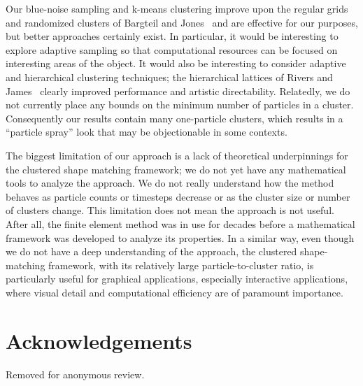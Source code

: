 \documentclass[review]{acmsiggraph}
\begin{document}
Our blue-noise sampling and k-means clustering improve upon the regular grids and
randomized clusters of Bargteil and Jones~ and are effective for our purposes,
but better approaches certainly exist.  In particular, it would be interesting to explore adaptive sampling
so that computational resources can be focused on interesting areas of the object.  It would also be interesting
to consider adaptive and hierarchical clustering techniques; the hierarchical lattices of Rivers and James~\cite{Rivers:2007:FFL}
clearly improved performance and artistic directability.  Relatedly, we do not currently place any bounds on the minimum
number of particles in a cluster.  Consequently our results contain many one-particle clusters, which results in a 
``particle spray'' look that may be objectionable in some contexts.

The biggest limitation of our approach is a lack of theoretical underpinnings for the clustered shape matching
framework; we do not yet have any mathematical tools to analyze the approach.  We do not really understand
how the method behaves as particle counts or timesteps decrease or as the cluster size or number of clusters change.
This limitation does not mean the approach is not useful.  After all, the finite element method was in use
for decades before a mathematical framework was developed to analyze its properties.  In a similar way,
even though we do not have a deep understanding of the approach, the clustered shape-matching framework, with its
relatively large particle-to-cluster ratio,
is particularly useful for graphical applications, especially interactive applications, where visual detail
and computational efficiency are of paramount importance.



\section*{Acknowledgements}
Removed for anonymous review.



\end{document}
